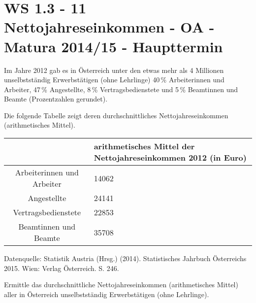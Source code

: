 \section{WS 1.3 - 11 Nettojahreseinkommen - OA - Matura 2014/15 - Haupttermin}

\begin{beispiel}[WS 1.3]{1} %
Im Jahre 2012 gab es in Österreich unter den etwas mehr als 4 Millionen unselbstständig
Erwerbstätigen (ohne Lehrlinge) 40\,\% Arbeiterinnen und Arbeiter, 47\,\% Angestellte,
8\,\% Vertragsbedienstete und 5\,\% Beamtinnen und Beamte (Prozentzahlen gerundet). \leer

Die folgende Tabelle zeigt deren durchschnittliches Nettojahreseinkommen (arithmetisches Mittel).

\begin{center}
\begin{longtable}{|c|C{7cm}|} 
 & arithmetisches Mittel der Nettojahreseinkommen 2012 (in Euro)  \\ \hline
Arbeiterinnen und Arbeiter & 14062 \\ \hline
Angestellte & 24141 \\ \hline
Vertragsbedienstete & 22853 \\ \hline
Beamtinnen und Beamte & 35708 \\ \hline
\end{longtable}
\end{center} \vspace{-1.5cm}
\tiny Datenquelle: Statistik Austria (Hrsg.) (2014). Statistisches Jahrbuch Österreichs 2015. Wien: Verlag Österreich. S. 246.
\normalsize

Ermittle das durchschnittliche Nettojahreseinkommen (arithmetisches Mittel) aller in
Österreich unselbstständig Erwerbstätigen (ohne Lehrlinge).



\end{beispiel}
